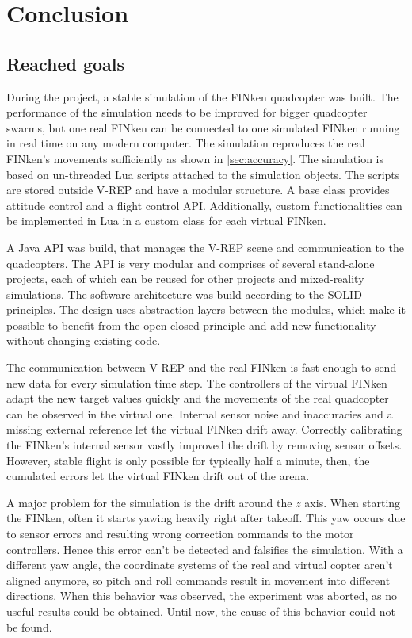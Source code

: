 \chapter{Conclusion}
\label{chap:conclusion}

\section{Reached goals}
\label{sec:conclusionGoals}
During the project, a stable simulation of the FINken quadcopter was built.
The performance of the simulation needs to be improved for bigger quadcopter swarms, but one real FINken can be connected to one simulated FINken running in real time on any modern computer.
The simulation reproduces the real FINken's movements sufficiently as shown in \ref{sec:accuracy}.
The simulation is based on un-threaded Lua scripts attached to the simulation objects.
The scripts are stored outside V-REP and have a modular structure.
A base class provides attitude control and a flight control API.
Additionally, custom functionalities can be implemented in Lua in a custom class for each virtual FINken.


A Java API was build, that manages the V-REP scene and communication to the quadcopters. 
The API is very modular and comprises of several stand-alone projects, each of which can be reused for other projects and mixed-reality simulations. The software architecture was build according to the  SOLID \cite{solid} principles.
The design uses abstraction layers between the modules, which make it possible to benefit from the open-closed principle and add new functionality without changing existing code.

The communication between V-REP and the real FINken is fast enough to send new data for every simulation time step.
The controllers of the virtual FINken adapt the new target values quickly and the movements of the real quadcopter can be observed in the virtual one.
Internal sensor noise and inaccuracies and a missing external reference let the virtual FINken drift away.
Correctly calibrating the FINken's internal sensor vastly improved the drift by removing sensor offsets.
However, stable flight is only possible for typically half a minute, then, the cumulated errors let the virtual FINken drift out of the arena.

A major problem for the simulation is the drift around the $z$ axis.
When starting the FINken, often it starts yawing heavily right after takeoff.
This yaw occurs due to sensor errors and resulting wrong correction commands to the motor controllers.
Hence this error can't be detected and falsifies the simulation.
With a different yaw angle, the coordinate systems of the real and virtual copter aren't aligned anymore, so pitch and roll commands result in movement into different directions.
When this behavior was observed, the experiment was aborted, as no useful results could be obtained.
Until now, the cause of this behavior could not be found.





